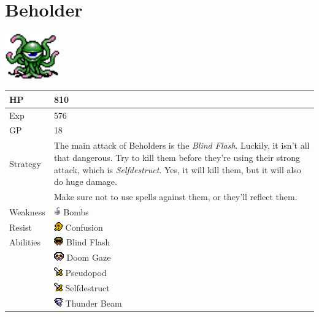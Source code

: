 \section{Beholder}
\label{monster:beholder}

\includegraphics[height=2cm,keepaspectratio]{./resources/monster/beholder}

\begin{longtable}{ l p{9cm} }
	HP
	& 810
\\ \hline
	Exp
	& 576
\\ \hline
	GP
	& 18
\\ \hline
	Strategy
	& The main attack of Beholders is the \textit{Blind Flash}. Luckily, it isn't all that dangerous. Try to kill them before they're using their strong attack, which is \textit{Selfdestruct}. Yes, it will kill them, but it will also do huge damage. \\
	& Make sure not to use spells against them, or they'll reflect them.
\\ \hline
	Weakness
	& \includegraphics[height=1em,keepaspectratio]{./resources/effects/bomb} Bombs
\\ \hline
	Resist
	& \includegraphics[height=1em,keepaspectratio]{./resources/effects/confusion} Confusion
\\ \hline
	Abilities
	& \includegraphics[height=1em,keepaspectratio]{./resources/effects/blind} Blind Flash \\
	& \includegraphics[height=1em,keepaspectratio]{./resources/effects/fatal} Doom Gaze \\
	& \includegraphics[height=1em,keepaspectratio]{./resources/effects/damage} Pseudopod \\
	& \includegraphics[height=1em,keepaspectratio]{./resources/effects/damage} Selfdestruct \\
	& \includegraphics[height=1em,keepaspectratio]{./resources/effects/wind} Thunder Beam
\end{longtable}
